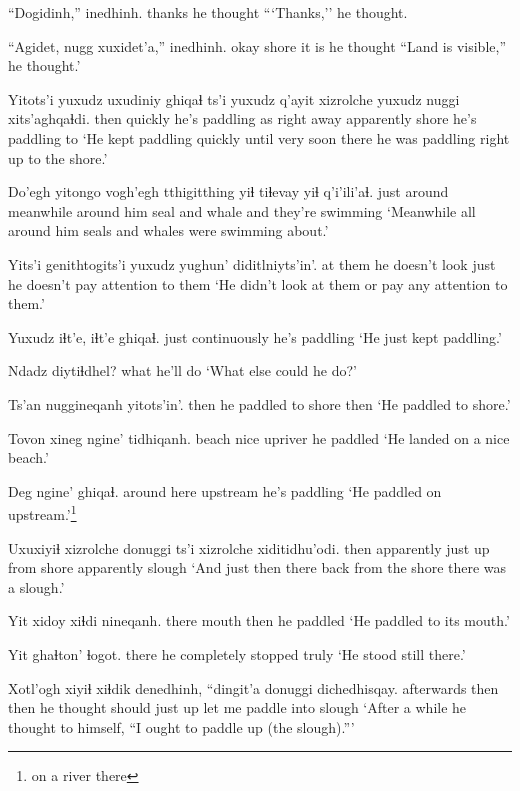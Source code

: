 \documentclass[12pt]{article}
\begin{document}
\gll ``Dogidinh,'' inedhinh. 
thanks   {he thought}
\glt ```Thanks,'' he thought. 
\glend

\gll ``Agidet, nugg xuxidet'a,'' inedhinh. 
okay  shore {it is} {he thought}
\glt  ``Land is visible,'' he thought.' 
\glend

\gll Yitots'i yuxudz uxudiniy {ghiqaɬ} ts'i yuxudz q'ayit xizrolche yuxudz nuggi xits'aghqaɬdi. 
then      {} quickly {he's paddling} as {} {right away} apparently {} shore {he's paddling to}
\glt `He kept paddling quickly until very soon there he was paddling right up to the shore.'
\glend

\gll Do'egh yitongo vogh'egh tthigitthing yiɬ tiɬevay yiɬ q'i'ili'aɬ. 
{just around} meanwhile {around him} seal and whale and {they're swimming}
\glt `Meanwhile all around him seals and whales were swimming about.' 
\glend

\gll Yits'i {genithtogits'i} yuxudz {yughun' diditlniyts'in'}. 
{at them} {he doesn't look} just {he doesn't pay attention to them}
\glt `He didn't look at them or pay any attention to them.' 
\glend

\gll Yuxudz {iɬt'e, iɬt'e} ghiqaɬ. 
just  continuously  {he's paddling} 
\glt `He just kept paddling.' 
\glend

\gll Ndadz diytiɬdhel? 
what {he'll do}
\glt  `What else could he do?' 
\glend

\gll Ts'an nuggineqanh yitots'in'. 
then  {he paddled to shore} then 
\glt `He paddled to shore.'
\glend

\gll Tovon xineg ngine' tidhiqanh. 
beach nice upriver {he paddled}
\glt  `He landed on a nice beach.' 
\glend

\gll Deg ngine' ghiqaɬ. 
{around here} upstream {he's paddling}
\glt `He paddled on upstream.'\footnote{on a river there}
\glend

\gll Uxuxiyiɬ xizrolche {donuggi ts'i} xizrolche xiditidhu'odi. 
then  apparently {just up from shore} apparently slough
\glt `And just then there back from the shore there was a slough.' 
\glend

\gll Yit xidoy xiɬdi nineqanh.
there mouth then {he paddled} 
\glt `He paddled to its mouth.' 
\glend

\gll Yit ghaɬton' ɬogot. 
there {he completely stopped}  truly
\glt `He stood still there.' 
\glend

\gll Xotl'ogh xiyiɬ xiɬdik denedhinh, ``dingit'a donuggi dichedhisqay. 
afterwards then then {he thought} should   {just up} {let me paddle into slough} 
\glt `After a while he thought to himself, ``I ought to paddle up (the slough).'''  
\glend
\end{document}
